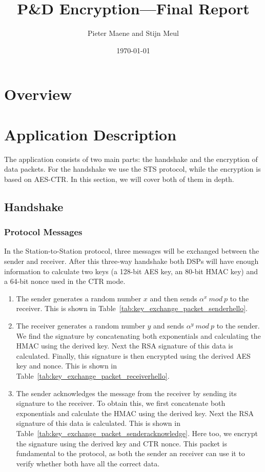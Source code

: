 \documentclass[a4paper]{article}
\title{P\&D Encryption---Final Report}
\author{Pieter Maene and Stijn Meul}
\date{\today}
\begin{document}
\maketitle

\section{Overview}

\section{Application Description}

The application consists of two main parts: the handshake and the encryption of data packets. For the handshake we use the STS protocol, while the encryption is based on AES-CTR. In this section, we will cover both of them in depth.

\subsection{Handshake}

\subsubsection{Protocol Messages}
In the Station-to-Station protocol, three messages will be exchanged between the sender and receiver. After this three-way handshake both DSPs will have enough information to calculate two keys (a 128-bit AES key, an 80-bit HMAC key) and a 64-bit nonce used in the CTR mode.

\begin{enumerate}
    \item The sender generates a random number $x$ and then sends $\alpha^x\ mod\ p$ to the receiver. This is shown in Table~\ref{tab:key_exchange_packet_senderhello}.
    \item The receiver generates a random number $y$ and sends $\alpha^y\ mod\ p$ to the sender. We find the signature by concatenating both exponentials and calculating the HMAC using the derived key. Next the RSA signature of this data is calculated. Finally, this signature is then encrypted using the derived AES key and nonce. This is shown in Table~\ref{tab:key_exchange_packet_receiverhello}.
    \item The sender acknowledges the message from the receiver by sending its signature to the receiver. To obtain this, we first concatenate both exponentials and calculate the HMAC using the derived key. Next the RSA signature of this data is calculated. This is shown in Table~\ref{tab:key_exchange_packet_senderacknowledge}. Here too, we encrypt the signature using the derived key and CTR nonce. This packet is fundamental to the protocol, as both the sender an receiver can use it to verify whether both have all the correct data.
\end{enumerate}
\end{document}
